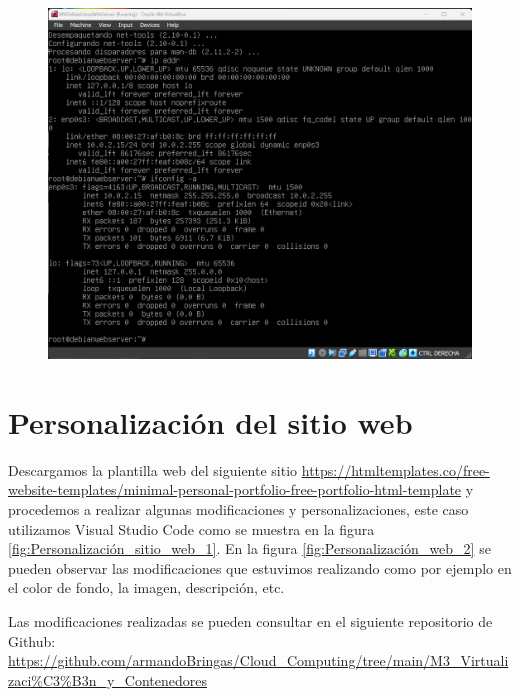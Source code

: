 \documentclass[12pt,a4paper]{article}
\begin{document}
\begin{itemize}
\begin{figure}[H]
    \centering
    \includegraphics[width=1\linewidth]{M3_Virtualización_y_Contenedores/Tarea_2_Máquina_Virtual_Local/reporte/figuras/4-2_Configuración_servicios.png}
    \label{fig:Configuración_serivicios_2}
\end{figure}


\section{Personalización del sitio web}


Descargamos la plantilla web del siguiente sitio \url{ https://htmltemplates.co/free-website-templates/minimal-personal-portfolio-free-portfolio-html-template} y procedemos a realizar algunas modificaciones y personalizaciones, este caso utilizamos Visual Studio Code como se muestra en la figura \ref{fig:Personalización_sitio_web_1}. En la figura \ref{fig:Personalización_web_2} se pueden observar las modificaciones que estuvimos realizando como por ejemplo en el color de fondo, la imagen, descripción, etc. 

Las modificaciones realizadas se pueden consultar en el siguiente repositorio de Github:
\url{https://github.com/armandoBringas/Cloud_Computing/tree/main/M3_Virtualizaci%C3%B3n_y_Contenedores}



\end{itemize}
\end{document}
